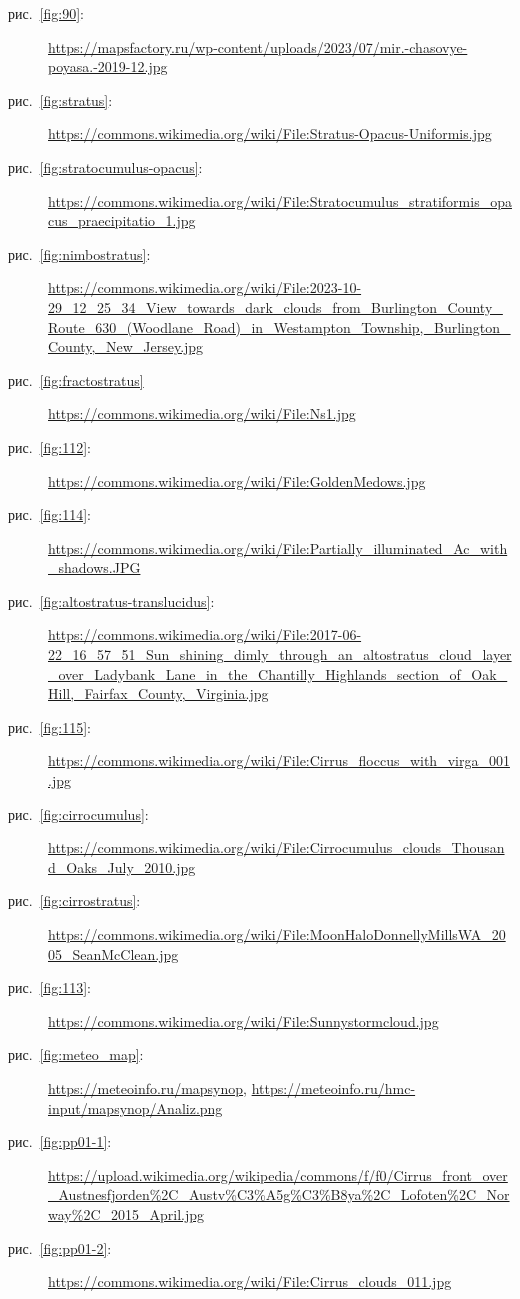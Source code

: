 \documentclass[a4paper, 12pt, twoside, final, book, russian, fittopage, cyremdash, openright]{ncc}
\newcommand{\rris}[1]{рис.~\ref{fig:#1}}
\begin{document}
\begin{description}
\item [\rris{90}:]
  \url{https://mapsfactory.ru/wp-content/uploads/2023/07/mir.-chasovye-poyasa.-2019-12.jpg}
\item [\rris{stratus}:]
  \url{https://commons.wikimedia.org/wiki/File:Stratus-Opacus-Uniformis.jpg}
\item [\rris{stratocumulus-opacus}:]
  \url{https://commons.wikimedia.org/wiki/File:Stratocumulus_stratiformis_opacus_praecipitatio_1.jpg}
\item [\rris{nimbostratus}:]
  \url{https://commons.wikimedia.org/wiki/File:2023-10-29_12_25_34_View_towards_dark_clouds_from_Burlington_County_Route_630_(Woodlane_Road)_in_Westampton_Township,_Burlington_County,_New_Jersey.jpg}
\item [\rris{fractostratus}]
  \url{https://commons.wikimedia.org/wiki/File:Ns1.jpg}
\item [\rris{112}:]
  \url{https://commons.wikimedia.org/wiki/File:GoldenMedows.jpg}
\item [\rris{114}:]
  \url{https://commons.wikimedia.org/wiki/File:Partially_illuminated_Ac_with_shadows.JPG}
\item[\rris{altostratus-translucidus}:]
  \url{https://commons.wikimedia.org/wiki/File:2017-06-22_16_57_51_Sun_shining_dimly_through_an_altostratus_cloud_layer_over_Ladybank_Lane_in_the_Chantilly_Highlands_section_of_Oak_Hill,_Fairfax_County,_Virginia.jpg}
\item[\rris{115}:]
  \url{https://commons.wikimedia.org/wiki/File:Cirrus_floccus_with_virga_001.jpg}
\item[\rris{cirrocumulus}:]
  \url{https://commons.wikimedia.org/wiki/File:Cirrocumulus_clouds_Thousand_Oaks_July_2010.jpg}
\item[\rris{cirrostratus}:]
  \url{https://commons.wikimedia.org/wiki/File:MoonHaloDonnellyMillsWA_2005_SeanMcClean.jpg}
\item[\rris{113}:]
  \url{https://commons.wikimedia.org/wiki/File:Sunnystormcloud.jpg}
\item[\rris{meteo_map}:] \url{https://meteoinfo.ru/mapsynop},
  \url{https://meteoinfo.ru/hmc-input/mapsynop/Analiz.png}
\item[\rris{pp01-1}:]
  \url{https://upload.wikimedia.org/wikipedia/commons/f/f0/Cirrus_front_over_Austnesfjorden%2C_Austv%C3%A5g%C3%B8ya%2C_Lofoten%2C_Norway%2C_2015_April.jpg}
\item[\rris{pp01-2}:]
  \url{https://commons.wikimedia.org/wiki/File:Cirrus_clouds_011.jpg}
\end{description}
\end{document}
